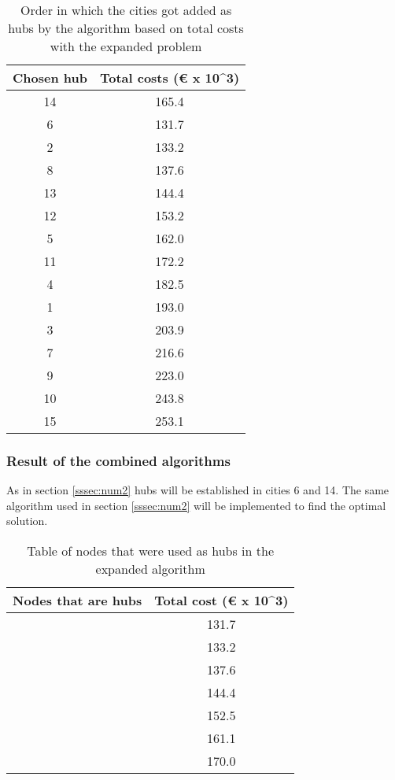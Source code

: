 \documentclass{article}
\begin{document}
\begin{table}[h]
    \centering
    \begin{tabular}{||c|c||}
    \hline
        Chosen hub & Total costs (€ x 10^3) \\
    \hline
    \hline
        14 & 165.4 \\
        \hline
        6 & 131.7 \\
        \hline
        2 & 133.2 \\
        \hline
        8 & 137.6 \\
        \hline
        13 & 144.4 \\
        \hline
        12 & 153.2 \\
        \hline
        5 & 162.0 \\
        \hline
        11 & 172.2 \\
        \hline
        4 & 182.5 \\
        \hline
        1 & 193.0 \\
        \hline
        3 & 203.9 \\
        \hline
        7 & 216.6 \\
        \hline
        9 & 223.0 \\
        \hline
        10 & 243.8 \\
        \hline
        15 & 253.1 \\
        \hline
    \end{tabular}
    \caption{\centering Order in which the cities got added as hubs by the algorithm based on total costs with the expanded problem}
    \label{tab:DistAlgExp2}
\end{table}

\subsubsection{Result of the combined algorithms}

As in section \ref{sssec:num2} hubs will be established in cities 6 and 14. The same algorithm used in section \ref{sssec:num2} will be implemented to find the optimal solution. 

\begin{table}[h]
\begin{center}
\begin{tabular}{||c |c||}
\hline
Nodes that are hubs & Total cost (€ x 10^3)\\
\hline
\hline
[6,14] &  131.7 \\
\hline
[6,14,2]   & 133.2\\
\hline
[6,14,2,8] & 137.6 \\
\hline
[6,14,2,8,13]  & 144.4  \\
\hline
[6,14,2,8,13,15] & 152.5 \\
\hline
[6,14,2,8,13,15,12] & 161.1 \\
\hline
[6,14,2,8,13,15,12,5] & 170.0 \\
\hline
\end{tabular}
\end{center}
\caption{Table of nodes that were used as hubs in the expanded algorithm}
\end{table}
\end{document}
